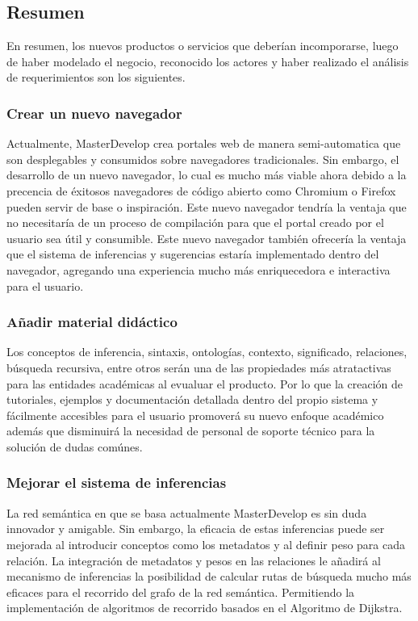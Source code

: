 \documentclass{article}
\begin{document}
\subsection{Resumen}
En resumen, los nuevos productos o servicios que deberían incomporarse, 
luego de haber modelado el negocio, reconocido los actores y haber
realizado el análisis de requerimientos son los siguientes.
\subsubsection{Crear un nuevo navegador}
Actualmente, MasterDevelop crea portales web de manera semi-automatica 
que son desplegables y consumidos sobre navegadores tradicionales. Sin
embargo, el desarrollo de un nuevo navegador, lo cual es mucho más
viable ahora debido a la precencia de éxitosos navegadores de código
abierto como Chromium o Firefox pueden servir de base o inspiración.
Este nuevo navegador tendría la ventaja que no necesitaría de un proceso
de compilación para que el portal creado por el usuario sea útil y 
consumible. Este nuevo navegador también ofrecería la ventaja
que el sistema de inferencias y sugerencias estaría implementado dentro
del navegador, agregando una experiencia mucho más enriquecedora 
e interactiva para el usuario.
\subsubsection{Añadir material didáctico}
Los conceptos de inferencia, sintaxis, ontologías, contexto, significado,
relaciones, búsqueda recursiva, entre otros serán una de las propiedades 
más atratactivas para las entidades académicas al evualuar el producto.
Por lo que la creación de tutoriales, ejemplos y documentación detallada
dentro del propio sistema y fácilmente accesibles para el usuario 
promoverá su nuevo enfoque académico además que disminuirá la necesidad
de personal de soporte técnico para la solución de dudas comúnes.
\subsubsection{Mejorar el sistema de inferencias}
La red semántica en que se basa actualmente MasterDevelop es sin duda
innovador y amigable. Sin embargo, la eficacia de estas inferencias 
puede ser mejorada al introducir conceptos como los metadatos y 
al definir peso para cada relación. La integración de metadatos y 
pesos en las relaciones le añadirá al mecanismo de inferencias la posibilidad
de calcular rutas de búsqueda mucho más eficaces para el recorrido del 
grafo de la red semántica. Permitiendo la implementación de algoritmos de 
recorrido basados en el Algoritmo de Dijkstra.
\end{document}
